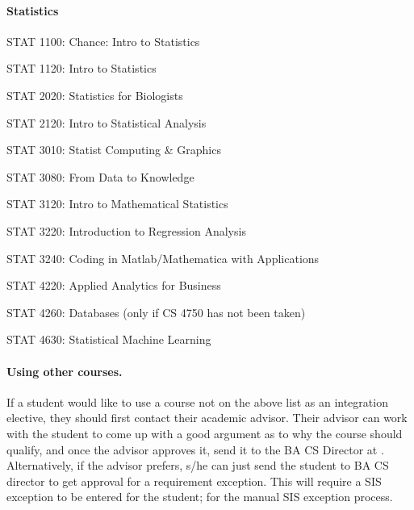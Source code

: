 \paragraph{Statistics}
\begin{itemlist}
\item STAT 1100: Chance: Intro to Statistics
\item STAT 1120: Intro to Statistics
\item STAT 2020: Statistics for Biologists
\item STAT 2120: Intro to Statistical Analysis
\item STAT 3010: Statist Computing & Graphics
\item STAT 3080: From Data to Knowledge
\item STAT 3120: Intro to Mathematical Statistics
\item STAT 3220: Introduction to Regression Analysis
\item STAT 3240: Coding in Matlab/Mathematica with Applications
\item STAT 4220: Applied Analytics for Business
\item STAT 4260: Databases (only if CS 4750 has not been taken)
\item STAT 4630: Statistical Machine Learning
\end{itemlist}



\paragraph{Using other courses.}  If a student would like to use a
course not on the above list as an integration elective, they should
first contact their academic advisor.  Their advisor can work with the
student to come up with a good argument as to why the course should
qualify, and once the advisor approves it, send it to the BA CS
Director at \bacsdirectoremail.  Alternatively, if the advisor
prefers, s/he can just send the student to BA CS director to get
approval for a requirement exception.  This will require a SIS
exception to be entered for the student;
for the manual SIS exception process.
